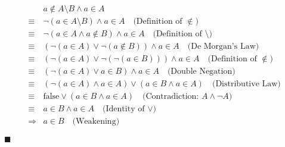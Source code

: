 \documentclass[12pt]{article}
\begin{document}
\begin{align*}
    & a \notin A \setminus B \land a \in A \\
    \equiv{} & \neg(a \in A \setminus B) \land a \in A \quad \text{(Definition of } \notin) \\
    \equiv{} & \neg(a \in A \land a \notin B) \land a \in A \quad \text{(Definition of } \setminus) \\
    \equiv{} & (\neg(a \in A) \lor \neg(a \notin B)) \land a \in A \quad \text{(De Morgan's Law)} \\
    \equiv{} & (\neg(a \in A) \lor \neg(\neg(a \in B))) \land a \in A \quad \text{(Definition of } \notin) \\
    \equiv{} & (\neg(a \in A) \lor a \in B) \land a \in A \quad \text{(Double Negation)} \\
    \equiv{} & (\neg(a \in A) \land a \in A) \lor (a \in B \land a \in A) \quad \text{(Distributive Law)} \\
    \equiv{} & \text{false} \lor (a \in B \land a \in A) \quad \text{(Contradiction: } A \land \neg A) \\
    \equiv{} & a \in B \land a \in A \quad \text{(Identity of } \lor) \\
    \Rightarrow{} & a \in B \quad \text{(Weakening)}
\end{align*}

\hfill\ensuremath{\blacksquare}
\end{document}
